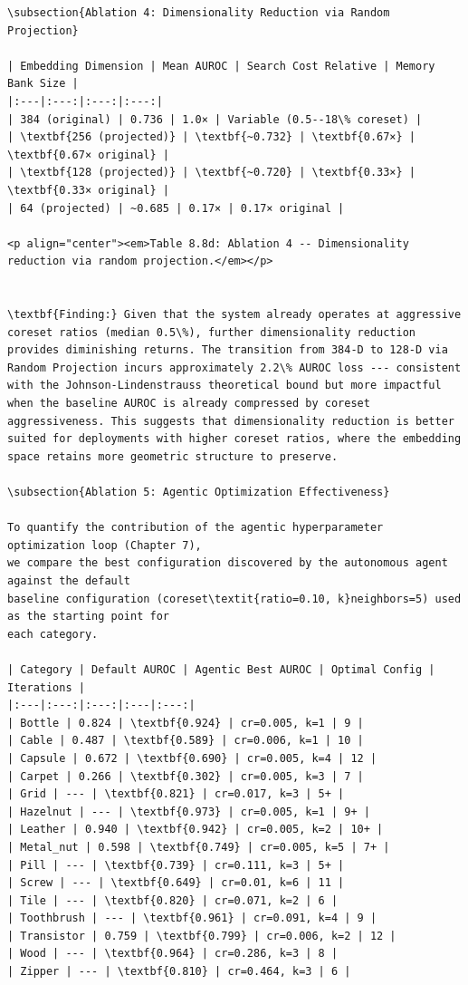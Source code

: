 \documentclass[12pt,a4paper,oneside]{report}
\begin{document}
\begin{verbatim}
\subsection{Ablation 4: Dimensionality Reduction via Random Projection}

| Embedding Dimension | Mean AUROC | Search Cost Relative | Memory Bank Size |
|:---|:---:|:---:|:---:|
| 384 (original) | 0.736 | 1.0× | Variable (0.5--18\% coreset) |
| \textbf{256 (projected)} | \textbf{~0.732} | \textbf{0.67×} | \textbf{0.67× original} |
| \textbf{128 (projected)} | \textbf{~0.720} | \textbf{0.33×} | \textbf{0.33× original} |
| 64 (projected) | ~0.685 | 0.17× | 0.17× original |

<p align="center"><em>Table 8.8d: Ablation 4 -- Dimensionality reduction via random projection.</em></p>


\textbf{Finding:} Given that the system already operates at aggressive coreset ratios (median 0.5\%), further dimensionality reduction provides diminishing returns. The transition from 384-D to 128-D via Random Projection incurs approximately 2.2\% AUROC loss --- consistent with the Johnson-Lindenstrauss theoretical bound but more impactful when the baseline AUROC is already compressed by coreset aggressiveness. This suggests that dimensionality reduction is better suited for deployments with higher coreset ratios, where the embedding space retains more geometric structure to preserve.

\subsection{Ablation 5: Agentic Optimization Effectiveness}

To quantify the contribution of the agentic hyperparameter optimization loop (Chapter 7), 
we compare the best configuration discovered by the autonomous agent against the default 
baseline configuration (coreset\textit{ratio=0.10, k}neighbors=5) used as the starting point for 
each category.

| Category | Default AUROC | Agentic Best AUROC | Optimal Config | Iterations |
|:---|:---:|:---:|:---|:---:|
| Bottle | 0.824 | \textbf{0.924} | cr=0.005, k=1 | 9 |
| Cable | 0.487 | \textbf{0.589} | cr=0.006, k=1 | 10 |
| Capsule | 0.672 | \textbf{0.690} | cr=0.005, k=4 | 12 |
| Carpet | 0.266 | \textbf{0.302} | cr=0.005, k=3 | 7 |
| Grid | --- | \textbf{0.821} | cr=0.017, k=3 | 5+ |
| Hazelnut | --- | \textbf{0.973} | cr=0.005, k=1 | 9+ |
| Leather | 0.940 | \textbf{0.942} | cr=0.005, k=2 | 10+ |
| Metal_nut | 0.598 | \textbf{0.749} | cr=0.005, k=5 | 7+ |
| Pill | --- | \textbf{0.739} | cr=0.111, k=3 | 5+ |
| Screw | --- | \textbf{0.649} | cr=0.01, k=6 | 11 |
| Tile | --- | \textbf{0.820} | cr=0.071, k=2 | 6 |
| Toothbrush | --- | \textbf{0.961} | cr=0.091, k=4 | 9 |
| Transistor | 0.759 | \textbf{0.799} | cr=0.006, k=2 | 12 |
| Wood | --- | \textbf{0.964} | cr=0.286, k=3 | 8 |
| Zipper | --- | \textbf{0.810} | cr=0.464, k=3 | 6 |


\end{verbatim}
\end{document}
